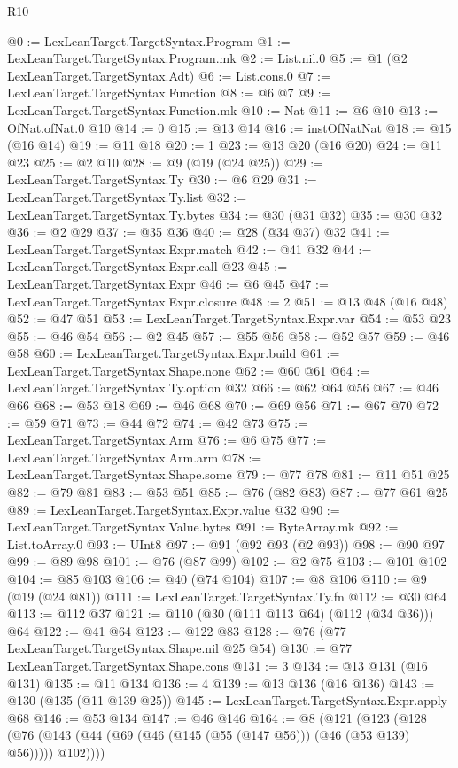 \begin{lexlean}{R10}
\begin{coremodule}
{{{{{{{@0 := LexLeanTarget.TargetSyntax.Program
@1 := LexLeanTarget.TargetSyntax.Program.mk
@2 := List.nil.{0}
@5 := @1 (@2 LexLeanTarget.TargetSyntax.Adt)
@6 := List.cons.{0}
@7 := LexLeanTarget.TargetSyntax.Function
@8 := @6 @7
@9 := LexLeanTarget.TargetSyntax.Function.mk
@10 := Nat
@11 := @6 @10
@13 := OfNat.ofNat.{0} @10
@14 := 0
@15 := @13 @14
@16 := instOfNatNat
@18 := @15 (@16 @14)
@19 := @11 @18
@20 := 1
@23 := @13 @20 (@16 @20)
@24 := @11 @23
@25 := @2 @10
@28 := @9 (@19 (@24 @25))
@29 := LexLeanTarget.TargetSyntax.Ty
@30 := @6 @29
@31 := LexLeanTarget.TargetSyntax.Ty.list
@32 := LexLeanTarget.TargetSyntax.Ty.bytes
@34 := @30 (@31 @32)
@35 := @30 @32
@36 := @2 @29
@37 := @35 @36
@40 := @28 (@34 @37) @32
@41 := LexLeanTarget.TargetSyntax.Expr.match
@42 := @41 @32
@44 := LexLeanTarget.TargetSyntax.Expr.call @23
@45 := LexLeanTarget.TargetSyntax.Expr
@46 := @6 @45
@47 := LexLeanTarget.TargetSyntax.Expr.closure
@48 := 2
@51 := @13 @48 (@16 @48)
@52 := @47 @51
@53 := LexLeanTarget.TargetSyntax.Expr.var
@54 := @53 @23
@55 := @46 @54
@56 := @2 @45
@57 := @55 @56
@58 := @52 @57
@59 := @46 @58
@60 := LexLeanTarget.TargetSyntax.Expr.build
@61 := LexLeanTarget.TargetSyntax.Shape.none
@62 := @60 @61
@64 := LexLeanTarget.TargetSyntax.Ty.option @32
@66 := @62 @64 @56
@67 := @46 @66
@68 := @53 @18
@69 := @46 @68
@70 := @69 @56
@71 := @67 @70
@72 := @59 @71
@73 := @44 @72
@74 := @42 @73
@75 := LexLeanTarget.TargetSyntax.Arm
@76 := @6 @75
@77 := LexLeanTarget.TargetSyntax.Arm.arm
@78 := LexLeanTarget.TargetSyntax.Shape.some
@79 := @77 @78
@81 := @11 @51 @25
@82 := @79 @81
@83 := @53 @51
@85 := @76 (@82 @83)
@87 := @77 @61 @25
@89 := LexLeanTarget.TargetSyntax.Expr.value @32
@90 := LexLeanTarget.TargetSyntax.Value.bytes
@91 := ByteArray.mk
@92 := List.toArray.{0}
@93 := UInt8
@97 := @91 (@92 @93 (@2 @93))
@98 := @90 @97
@99 := @89 @98
@101 := @76 (@87 @99)
@102 := @2 @75
@103 := @101 @102
@104 := @85 @103
@106 := @40 (@74 @104)
@107 := @8 @106
@110 := @9 (@19 (@24 @81))
@111 := LexLeanTarget.TargetSyntax.Ty.fn
@112 := @30 @64
@113 := @112 @37
@121 := @110 (@30 (@111 @113 @64) (@112 (@34 @36))) @64
@122 := @41 @64
@123 := @122 @83
@128 := @76 (@77 LexLeanTarget.TargetSyntax.Shape.nil @25 @54)
@130 := @77 LexLeanTarget.TargetSyntax.Shape.cons
@131 := 3
@134 := @13 @131 (@16 @131)
@135 := @11 @134
@136 := 4
@139 := @13 @136 (@16 @136)
@143 := @130 (@135 (@11 @139 @25))
@145 := LexLeanTarget.TargetSyntax.Expr.apply @68
@146 := @53 @134
@147 := @46 @146
@164 := @8
    (@121
      (@123
        (@128 (@76 (@143 (@44 (@69 (@46 (@145 (@55 (@147 @56))) (@46 (@53 @139) @56))))) @102))))
}}}}}}}
\end{coremodule}
\end{lexlean}
